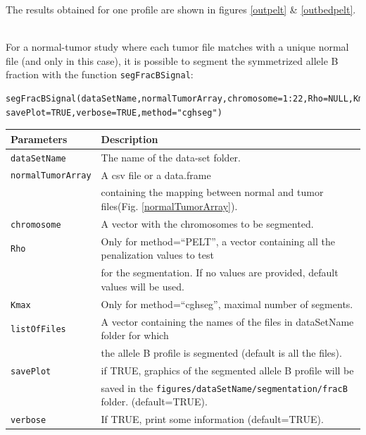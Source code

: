 \documentclass[a4paper,10pt]{article}
\begin{document}
		The results obtained for one profile are shown in figures \ref{outpelt} \& \ref{outbedpelt}.
		
		~~\\
	  
		For a normal-tumor study where each tumor file matches with a unique normal file (and only in this case), it is possible to segment the symmetrized allele B fraction with the function \texttt{segFracBSignal}:
		 	
		\begin{verbatim}	
segFracBSignal(dataSetName,normalTumorArray,chromosome=1:22,Rho=NULL,Kmax=10,listOfFiles=NULL,
savePlot=TRUE,verbose=TRUE,method="cghseg")
		\end{verbatim}
	
		\begin{center}
			\begin{tabular}{|l|l|}
				\hline
				Parameters & Description\\
				\hline
				\texttt{dataSetName} & The name of the data-set folder.\\
				\texttt{normalTumorArray} & A csv file or a data.frame\\
				~~ & containing the mapping between normal and tumor files(Fig. \ref{normalTumorArray}).\\
				\texttt{chromosome} & A vector with the chromosomes to be segmented.\\
  			\texttt{Rho} & Only for method=``PELT'', a vector containing all the penalization values to test\\
				~ &  for the segmentation. If no values are provided, default values will be used.\\
        \texttt{Kmax} & Only for method=``cghseg'', maximal number of segments.\\
				\texttt{listOfFiles} & A vector containing the names of the files in dataSetName folder for which\\
				~ & the allele B profile is segmented (default is all the files).\\
				\texttt{savePlot} & if TRUE, graphics of the segmented allele B profile will be\\
				~~ & saved in the \texttt{figures/dataSetName/segmentation/fracB} folder. (default=TRUE).\\
        \texttt{verbose} & If TRUE, print some information (default=TRUE).\\
				\hline	
			\end{tabular}		
		\end{center}		
		
\end{document}
